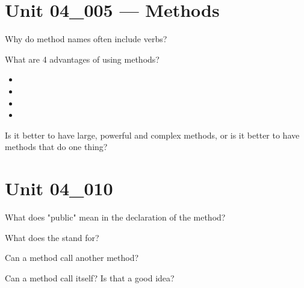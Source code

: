 \documentclass[letterpaper,12pt]{exam}
\newcommand{\unit}{Unit 04}
\begin{document}
\begin{questions}

\section*{\unit\_005 --- Methods} %

\begin{samepage}
	\question Why do method names often include verbs?
	\vspace{5mm}
\end{samepage}

\begin{samepage}
	\question What are 4 advantages of using methods?
	  \begin{itemize}
		\item 
		\vspace{5mm}
		\item 
		\vspace{5mm}
		\item 
		\vspace{5mm}
		\item 
		\vspace{5mm}
	   \end{itemize}
\end{samepage}

\begin{samepage}
	\question Is it better to have large, powerful and complex methods, or is it better to have methods that do one thing?
	\vspace{5mm}
\end{samepage}

\section*{\unit\_010} %

\begin{samepage}
	\question What does "public" mean in the declaration of the method?
	\vspace{5mm}
\end{samepage}

\begin{samepage}
	\question What does the  stand for?
	\vspace{5mm}
\end{samepage}

\begin{samepage}
	\question Can a method call another method?
	\vspace{5mm}
\end{samepage}
\begin{samepage}
	\question Can a method call itself?  Is that a good idea?
	\vspace{5mm}
\end{samepage}


\end{questions}
\end{document}
